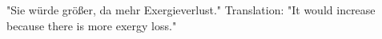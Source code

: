 "Sie würde größer, da mehr Exergieverlust."  
Translation: "It would increase because there is more exergy loss."